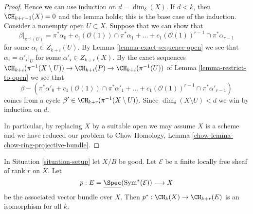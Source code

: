 \begin{proof}
\medskip\noindent
Hence we can use induction on $d = \dim_\delta(X)$.
If $d < k$, then $\CH_{k + r - 1}(X) = 0$ and the lemma holds;
this is the base case of the induction.
Consider a nonempty open $U \subset X$.
Suppose that we can show that
$$
\beta|_{\pi^{-1}(U)} =
\pi^*\alpha_0 +
c_1(\mathcal{O}(1)) \cap \pi^*\alpha_1 +
\ldots +
c_1(\mathcal{O}(1))^{r - 1} \cap \pi^*\alpha_{r - 1}
$$
for some $\alpha_i \in Z_{k + i}(U)$.
By Lemma \ref{lemma-exact-sequence-open} we see that
$\alpha_i = \alpha'_i|_U$ for some $\alpha'_i \in Z_{k + i}(X)$.
By the exact sequences
$\CH_{k + i}(\pi^{-1}(X \setminus U)) \to \CH_{k + i}(P) \to
\CH_{k + i}(\pi^{-1}(U))$
of Lemma \ref{lemma-restrict-to-open}
we see that
$$
\beta -
\left(\pi^*\alpha'_0 +
c_1(\mathcal{O}(1)) \cap \pi^*\alpha'_1 +
\ldots +
c_1(\mathcal{O}(1))^{r - 1} \cap \pi^*\alpha'_{r - 1}\right)
$$
comes from a cycle $\beta' \in \CH_{k + r}(\pi^{-1}(X \setminus U))$.
Since $\dim_\delta(X \setminus U) < d$ we win by
induction on $d$.

\medskip\noindent
In particular, by replacing $X$ by a suitable open we may assume
$X$ is a scheme and we have reduced our problem to
Chow Homology, Lemma \ref{chow-lemma-chow-ring-projective-bundle}.
\end{proof}

\begin{lemma}
\label{lemma-vectorbundle}
In Situation \ref{situation-setup} let $X/B$ be good.
Let $\mathcal{E}$ be a finite locally free sheaf of rank $r$ on $X$.
Let
$$
p :
E = \underline{\Spec}(\text{Sym}^*(\mathcal{E}))
\longrightarrow
X
$$
be the associated vector bundle over $X$.
Then $p^* : \CH_k(X) \to \CH_{k + r}(E)$ is an isomorphism for all $k$.
\end{lemma}

